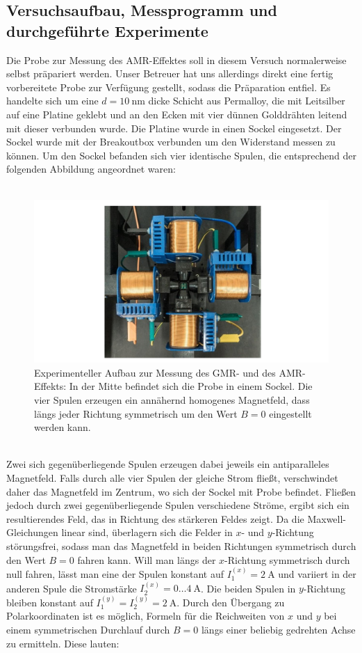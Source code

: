 \documentclass[german,  %
parskip=full,  %
]{scrartcl}
\begin{document}
\subsection{Versuchsaufbau, Messprogramm und durchgeführte Experimente}
Die Probe zur Messung des AMR-Effektes soll in diesem Versuch normalerweise selbst präpariert werden. Unser Betreuer hat uns allerdings direkt eine fertig vorbereitete Probe zur Verfügung gestellt, sodass die Präparation entfiel. Es handelte sich um eine \(d=10 \ \mathrm{nm}\) dicke Schicht aus Permalloy, die mit Leitsilber auf eine Platine geklebt und an den Ecken mit vier dünnen Golddrähten leitend mit dieser verbunden wurde. Die Platine wurde in einen Sockel eingesetzt. Der Sockel wurde mit der Breakoutbox verbunden um den Widerstand messen zu können. Um den Sockel befanden sich vier identische Spulen, die entsprechend der folgenden Abbildung angeordnet waren: \\\\
\begin{figure}[h!]\centering
\includegraphics[width=\textwidth]{Versuchsaufbau.jpg}
\caption{Experimenteller Aufbau zur Messung des GMR- und des AMR-Effekts: In der Mitte befindet sich die Probe in einem Sockel. Die vier Spulen erzeugen ein annähernd homogenes Magnetfeld, dass längs jeder Richtung symmetrisch um den Wert \(B=0\) eingestellt werden kann.}
\end{figure} \\
Zwei sich gegenüberliegende Spulen erzeugen dabei jeweils ein antiparalleles Magnetfeld. Falls durch alle vier Spulen der gleiche Strom fließt, verschwindet daher das Magnetfeld im Zentrum, wo sich der Sockel mit Probe befindet. Fließen jedoch durch zwei gegenüberliegende Spulen verschiedene Ströme, ergibt sich ein resultierendes Feld, das in Richtung des stärkeren Feldes zeigt. Da die Maxwell-Gleichungen linear sind, überlagern sich die Felder in \(x\)- und \(y\)-Richtung störungsfrei, sodass man das Magnetfeld in beiden Richtungen symmetrisch durch den Wert \(B=0\) fahren kann. Will man längs der \(x\)-Richtung symmetrisch durch null fahren, lässt man eine der Spulen konstant auf  \(I_1^{(x)}=2 \ \mathrm{A}\) und variiert in der anderen Spule die Stromstärke \(I_2^{(x)} = 0\hdots 4 \ \mathrm{A}\). Die beiden Spulen in \(y\)-Richtung bleiben konstant auf \(I_1^{(y)} = I_2^{(y)} = 2 \ \mathrm{A}\). Durch den Übergang zu Polarkoordinaten ist es möglich, Formeln für die Reichweiten von \(x\) und \(y\) bei einem symmetrischen Durchlauf durch \(B=0\) längs einer beliebig gedrehten Achse zu ermitteln. Diese lauten:
\end{document}
